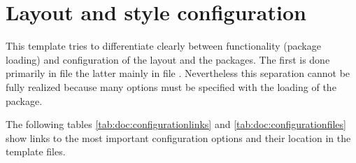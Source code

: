 \section{Layout and style configuration}
\label{sec:doc:faq:style}

This template tries to differentiate clearly between functionality (package loading) and configuration of the layout and the packages. The first is done primarily in file  the latter mainly in file . Nevertheless this separation cannot be fully realized because many options must be specified with the loading of the package.

The following tables \ref{tab:doc:configurationlinks} and \ref{tab:doc:configurationfiles} show links to the most important configuration options and their location in the template files.

